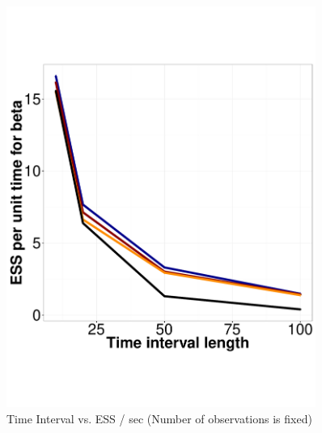 \begin{figure}
\begin{minipage}[hp]{0.45\linewidth}
    \includegraphics [width=0.90\textwidth, angle=0]{figs/ESS_vs_t_beta_fixobservation.pdf}
    \vspace{-0 in}
  \end{minipage}
    \caption{Time Interval vs. ESS / sec (Number of observations is fixed)}
     \label{fig:TSS_fix}
  \end{figure}




